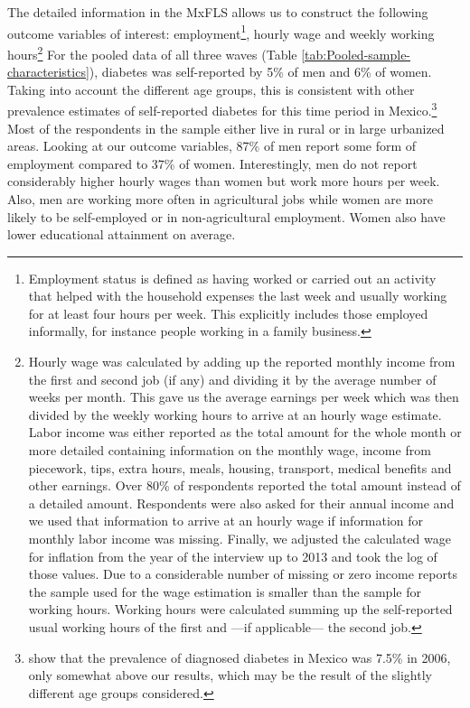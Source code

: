 \documentclass[12pt,english]{article}
\begin{document}
The detailed information in the \ac{MxFLS} allows us to construct the following outcome variables of interest: employment\footnote{Employment status is defined as having worked or carried out an activity that helped with the household expenses the last week and usually working for at least four hours per week. This explicitly includes those employed informally, for instance people working in a family business.}, hourly wage and weekly working hours\footnote{Hourly wage was calculated by adding up the reported monthly income from the first and second job (if any) and dividing it by the average number of weeks per month. This gave us the average earnings per week which was then divided by the weekly working hours to arrive at an hourly wage estimate. Labor income was either reported as the total amount for the whole month or more detailed containing information on the monthly wage, income from piecework, tips, extra hours, meals, housing, transport, medical benefits and other earnings. Over 80\% of respondents reported the total amount instead of a detailed amount. Respondents were also asked for their annual income and we used that information to arrive at an hourly wage if information for monthly labor income was missing. Finally, we adjusted the calculated wage for inflation from the year of the interview up to 2013 and took the log of those values. Due to a considerable number of missing or zero income reports the sample used for the wage estimation is smaller than the sample for working hours. Working hours were calculated summing up the self-reported usual working hours of the first and ---if applicable--- the second job.} For the pooled data of all three waves (Table  \ref{tab:Pooled-sample-characteristics}), diabetes was self-reported by 5\% of men and 6\% of women. Taking into account the different age groups, this is consistent with other prevalence estimates of self-reported diabetes for this time period in Mexico.\footnote{\textcite{Barquera2013} show that the prevalence of diagnosed diabetes in Mexico was 7.5\% in 2006, only somewhat above our results, which may be the result of the slightly different age groups considered.}  Most of the respondents in the sample either live in rural or in large urbanized areas. Looking at our outcome variables, 87\% of men report some form of employment compared to 37\% of women. Interestingly, men do not report considerably higher hourly wages than women but work more hours per week. Also, men are working more often in agricultural jobs while women are more likely to be self-employed or in non-agricultural employment. Women also have lower educational attainment on average. 
\end{document}
